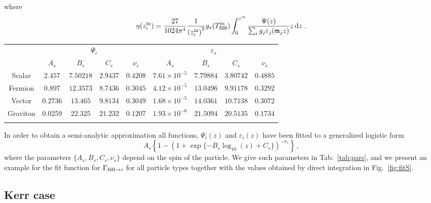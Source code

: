 \documentclass[aps,prd,reprint,twocolumn,preprintnumbers,floatfix,nofootinbib]{revtex4-1}
\newcommand{\TBH}{T_{\rm BH}}
\begin{document}
where 
\begin{equation}
     \eta(z_i^{\rm in})=\frac{27}{1024\pi^4}\frac{1}{\left(z_i^{\rm in}\right)^2} g_{\star}(\TBH^{\rm in})\int_0^{z^{\rm in}}\frac{\Psi(z)}{\sum_i g_{j}\varepsilon_j(\mathfrak{m}_j z)}z\dd{z}\,.
\end{equation}
\begin{table*}[t]
\caption{Fitting parameters for our analytical form, Eq.~\eqref{eq:fitf}, in the Schwarzschild case.  \label{tab:pars}}
    \vspace{1mm}
    \centering
    \begin{tabular}{c|cccc|cccc}
        \toprule
         & \multicolumn{4}{c}{$\Psi_i$} & \multicolumn{4}{c}{$\varepsilon_s$} \\
         & $A_s$ & $B_s$ &  $C_s$ & $\nu_s$ & $A_s$ & $B_s$ &  $C_s$ & $\nu_s$ \\ \colrule
        Scalar & $2.457$ & $7.50218$ & $2.9437$ & $0.4208$ & $7.61\times 10^{-5}$ & $7.79884$ & $3.80742$ & $0.4885$\\ 
        Fermion & $0.897$ & $12.3573$ & $8.7436$ & $0.3045$ & $4.12\times 10^{-5}$ & $13.0496$ & $9.91178$ & $0.3292$\\ 
        Vector & $0.2736$ & $13.465$ & $9.8134$ & $0.3049$ & $1.68\times 10^{-5}$ & $14.0361$ & $10.7138$ & $0.3072$\\ 
        Graviton & $0.0259$ & $22.325$ & $21.232$ & $0.1207$ & $1.93\times 10^{-6}$ & $21.5094$ & $20.5135$ & $0.1734$\\\botrule
    \end{tabular}
\end{table*}
In order to obtain a semi-analytic approximation all functions, $\Psi_i(z)$ and $\varepsilon_i(z)$ have been fitted to a generalized logistic form
\begin{equation}\label{eq:fitf}
    A_s\left\{1-(1+\exp\{-B_s\log_{10}(z)+C_s\})^{-\nu_s}\right\}\,,
\end{equation}
where the parameters $\{A_s,B_s,C_s,\nu_s\}$ depend on the spin of the particle. We give such parameters in Tab.~\ref{tab:pars}, and we present an example for the fit function for $\Gamma_{{\rm BH} \to i}$ for all particle types together with the values obtained by direct integration in Fig.~\ref{fig:fitS}.\\

\subsection{Kerr case}
\end{document}
